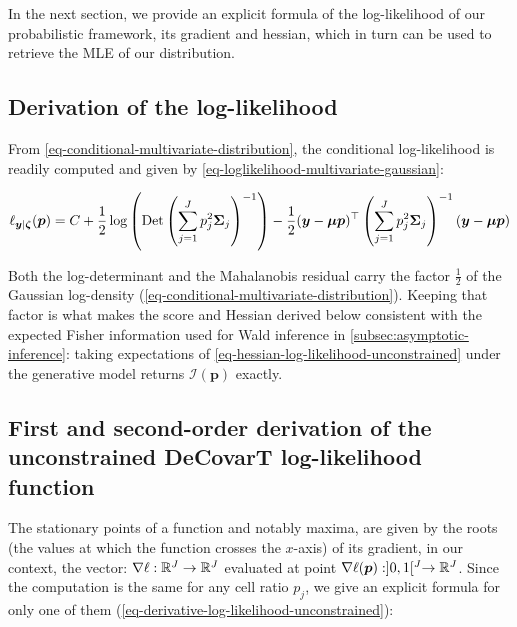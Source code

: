 \documentclass[pdflatex, sn-nature]{sn-jnl}
\theoremstyle{thmstyleone}%
\theoremstyle{thmstyletwo}%
\theoremstyle{thmstylethree}%
\begin{document}
    In the next section, we provide an explicit formula of the log-likelihood of
    our probabilistic framework, its gradient and hessian, which in turn can be
    used to retrieve the MLE of our distribution.

    \subsection{Derivation of the log-likelihood}

    From \ref{eq-conditional-multivariate-distribution}, the conditional log-likelihood
    is readily computed and given by
    \ref{eq-loglikelihood-multivariate-gaussian}:

    \begin{equation}
        \ell_{\boldsymbol{y} | \boldsymbol{\zeta}}(\boldsymbol{p})=C + \frac{1}{2}\log
        \left(\operatorname*{Det} \left(\sum_{j=1}^{J} p_{j}^{2}\boldsymbol{\Sigma}_{j}\right)^{-1}\right
        ) - \frac{1}{2}(\boldsymbol{y}- \boldsymbol{\mu}\boldsymbol{p})^{\top} \left
        (\sum_{j=1}^{J} p_{j}^{2}\boldsymbol{\Sigma}_{j}\right)^{-1}(\boldsymbol{y}
        - \boldsymbol{\mu}\boldsymbol{p}) \label{eq-loglikelihood-multivariate-gaussian}
    \end{equation}

    Both the log-determinant and the Mahalanobis residual carry the factor
    $\frac{1}{2}$ of the Gaussian log-density
    (\ref{eq-conditional-multivariate-distribution}). Keeping that factor is
    what makes the score and Hessian derived below consistent with the
    expected Fisher information used for Wald inference in
    \ref{subsec:asymptotic-inference}: taking expectations of
    \ref{eq-hessian-log-likelihood-unconstrained} under the generative model
    returns $\mathcal{I}(\boldsymbol{p})$ exactly.

    \subsection{First and second-order derivation of the unconstrained DeCovarT
    log-likelihood function}
    \label{subsec:uncontrained-optimisation}

    The stationary points of a function and notably maxima, are given by the roots
    (the values at which the function crosses the $x$-axis) of its gradient, in
    our context, the vector: $\nabla \ell: \mathbb{R}^{J} \to \mathbb{R}^{J}$ evaluated at
    point $\nabla \ell (\boldsymbol{p}): ]0, 1[^{J} \to \mathbb{R}^{J}$. Since the computation
    is the same for any cell ratio $p_{j}$, we give an explicit formula for only
    one of them (\ref{eq-derivative-log-likelihood-unconstrained}):
\end{document}
